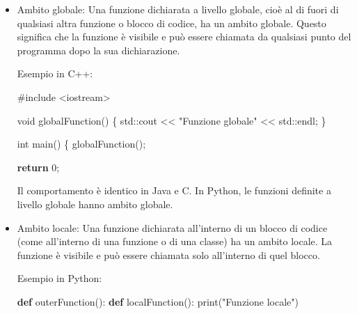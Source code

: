 \documentclass[
  letterpaper,
]{scrbook}
\newenvironment{Shaded}{\begin{snugshade}}{\end{snugshade}}
\newcommand{\BuiltInTok}[1]{\textcolor[rgb]{0.00,0.23,0.31}{#1}}
\newcommand{\ControlFlowTok}[1]{\textcolor[rgb]{0.00,0.23,0.31}{\textbf{#1}}}
\newcommand{\DataTypeTok}[1]{\textcolor[rgb]{0.68,0.00,0.00}{#1}}
\newcommand{\DecValTok}[1]{\textcolor[rgb]{0.68,0.00,0.00}{#1}}
\newcommand{\ImportTok}[1]{\textcolor[rgb]{0.00,0.46,0.62}{#1}}
\newcommand{\KeywordTok}[1]{\textcolor[rgb]{0.00,0.23,0.31}{\textbf{#1}}}
\newcommand{\NormalTok}[1]{\textcolor[rgb]{0.00,0.23,0.31}{#1}}
\newcommand{\OperatorTok}[1]{\textcolor[rgb]{0.37,0.37,0.37}{#1}}
\newcommand{\PreprocessorTok}[1]{\textcolor[rgb]{0.68,0.00,0.00}{#1}}
\newcommand{\StringTok}[1]{\textcolor[rgb]{0.13,0.47,0.30}{#1}}
\providecommand{\tightlist}{%
  \setlength{\itemsep}{0pt}\setlength{\parskip}{0pt}}\usepackage{longtable,booktabs,array}
\newcommand*\circled[1]{\tikz[baseline=(char.base)]{
          \node[shape=circle,draw,inner sep=1pt] (char) {{\scriptsize#1}};}}
\begin{document}
\begin{itemize}
\item
  Ambito globale: Una funzione dichiarata a livello globale, cioè al di
  fuori di qualsiasi altra funzione o blocco di codice, ha un ambito
  globale. Questo significa che la funzione è visibile e può essere
  chiamata da qualsiasi punto del programma dopo la sua dichiarazione.

  Esempio in C++:

\label{annotated-cell-124}%
\begin{Shaded}
\begin{Highlighting}[]
\PreprocessorTok{\#include }\ImportTok{\textless{}iostream\textgreater{}}

\DataTypeTok{void}\NormalTok{ globalFunction}\OperatorTok{()} \OperatorTok{\{} \hspace*{\fill}\NormalTok{\circled{1}}
  \BuiltInTok{std::}\NormalTok{cout }\OperatorTok{\textless{}\textless{}} \StringTok{"Funzione globale"} \OperatorTok{\textless{}\textless{}} \BuiltInTok{std::}\NormalTok{endl}\OperatorTok{;}
\OperatorTok{\}}

\DataTypeTok{int}\NormalTok{ main}\OperatorTok{()} \OperatorTok{\{}
\NormalTok{  globalFunction}\OperatorTok{();} \hspace*{\fill}\NormalTok{\circled{2}}

  \ControlFlowTok{return} \DecValTok{0}\OperatorTok{;}
\end{Highlighting}
\end{Shaded}


  Il comportamento è identico in Java e C. In Python, le funzioni
  definite a livello globale hanno ambito globale.
\item
  Ambito locale: Una funzione dichiarata all'interno di un blocco di
  codice (come all'interno di una funzione o di una classe) ha un ambito
  locale. La funzione è visibile e può essere chiamata solo all'interno
  di quel blocco.

  Esempio in Python:

\label{annotated-cell-125}%
\begin{Shaded}
\begin{Highlighting}[]
\KeywordTok{def}\NormalTok{ outerFunction():}
  \KeywordTok{def}\NormalTok{ localFunction(): }\hspace*{\fill}\NormalTok{\circled{1}}
    \BuiltInTok{print}\NormalTok{(}\StringTok{"Funzione locale"}\NormalTok{)}


\end{Highlighting}
\end{Shaded}
\end{itemize}
\end{document}
